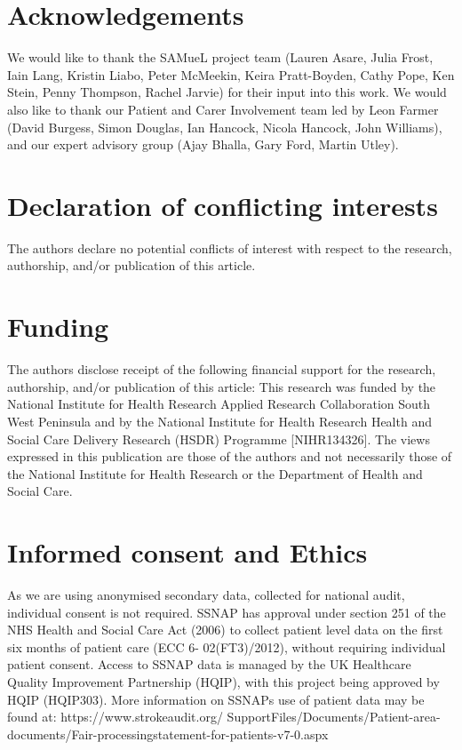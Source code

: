 \section*{Acknowledgements}

We would like to thank the SAMueL project team (Lauren Asare, Julia Frost, Iain Lang, Kristin Liabo, Peter McMeekin, Keira Pratt-Boyden, Cathy Pope, Ken Stein, Penny Thompson, Rachel Jarvie) for their input into this work. We would also like to thank our Patient and Carer Involvement team led by Leon Farmer (David Burgess, Simon Douglas, Ian Hancock, Nicola Hancock, John Williams), and our expert advisory group (Ajay Bhalla, Gary Ford, Martin Utley).

\section*{Declaration of conflicting interests}

The authors declare no potential conflicts of interest with respect to the research, authorship, and/or publication of this article. 

\section*{Funding}

The authors disclose receipt of the following financial support for the research, authorship, and/or publication of this article: This research was funded by the National Institute for Health Research Applied Research Collaboration South West Peninsula and by the National Institute for Health Research Health and Social Care Delivery Research (HSDR) Programme [NIHR134326]. The views expressed in this publication are those of the authors and not necessarily those of the National Institute for Health Research or the Department of Health and Social Care. 

\section*{Informed consent and Ethics}

As we are using anonymised secondary data, collected for national audit, individual consent is not required. SSNAP has approval under section 251 of the NHS Health and Social Care Act (2006) to collect patient level data on the first six months of patient care (ECC 6- 02(FT3)/2012), without requiring individual patient consent. Access to SSNAP data is managed by the UK Healthcare Quality Improvement Partnership (HQIP), with this project being approved by HQIP (HQIP303). More information on SSNAPs use of patient data may be found at: https://www.strokeaudit.org/ SupportFiles/Documents/Patient-area-documents/Fair-processingstatement-for-patients-v7-0.aspx


